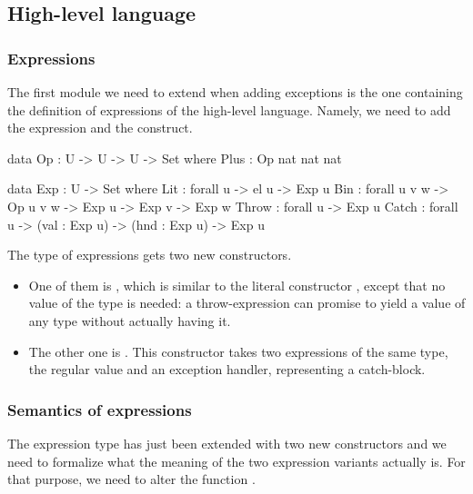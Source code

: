 
\subsection{High-level language}

\subsubsection{Expressions}

The first module we need to extend when adding exceptions is the one containing
the definition of expressions of the high-level language. Namely, we need to
add the  expression and the  construct.

\begin{code}
  data Op : U -> U -> U -> Set where
    Plus : Op nat nat nat
\end{code}

\begin{code}
  data Exp : U -> Set where
    Lit : forall {u} -> el u -> Exp u
    Bin : forall {u v w} -> Op u v w -> Exp u -> Exp v -> Exp w
    Throw : forall {u} -> Exp u
    Catch : forall {u} -> (val : Exp u) -> (hnd : Exp u) -> Exp u
\end{code}

\noindent The type of expressions gets two new constructors.
\begin{itemize}

  \item One of them is , which is similar to the literal
    constructor , except that no value of the type  is
    needed: a throw-expression can promise to yield a value of any type without
    actually having it.

  \item The other one is . This constructor takes two expressions of
    the same type, the regular value and an exception handler, representing a
    catch-block.

\end{itemize}

\subsubsection{Semantics of expressions}
\label{sec:expression-semantics}

The expression type has just been extended with two new constructors and we
need to formalize what the meaning of the two expression variants actually is.
For that purpose, we need to alter the function .

